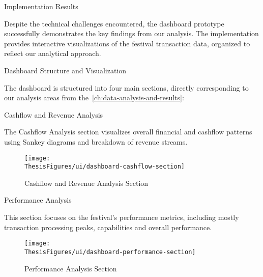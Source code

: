 \begin{section}{Implementation Results}
	\label{sec:implementation-results}

	Despite the technical challenges encountered, the dashboard prototype successfully demonstrates the key findings from our analysis.
	The implementation provides interactive visualizations of the festival transaction data, organized to reflect our analytical approach.

	\begin{subsection}{Dashboard Structure and Visualization}
		\label{subsec:implementation-results-structure}

		The dashboard is structured into four main sections, directly corresponding to our analysis areas from the~\autoref{ch:data-analysis-and-results}:

		\begin{subsubsection}{Cashflow and Revenue Analysis}
			\label{subsubsec:implementation-results-structure-cashflow}

			The Cashflow Analysis section visualizes overall financial and cashflow patterns using Sankey diagrams and breakdown of revenue streams.

			\begin{figure}[H]
				\centering
				\texttt{[image: \\ThesisFigures/ui/dashboard-cashflow-section]}
				\caption{Cashflow and Revenue Analysis Section}
				\label{fig:dashboard-cashflow-analysis}
			\end{figure}
		\end{subsubsection}

		\begin{subsubsection}{Performance Analysis}
			\label{subsubsec:implementation-results-structure-performance}

			This section focuses on the festival's performance metrics, including mostly transaction processing peaks, capabilities and overall performance.

			\begin{figure}[H]
				\centering
				\texttt{[image: \\ThesisFigures/ui/dashboard-performance-section]}
				\caption{Performance Analysis Section}
				\label{fig:dashboard-performance-metrics}
			\end{figure}
		\end{subsubsection}


\end{subsection}
\end{section}

